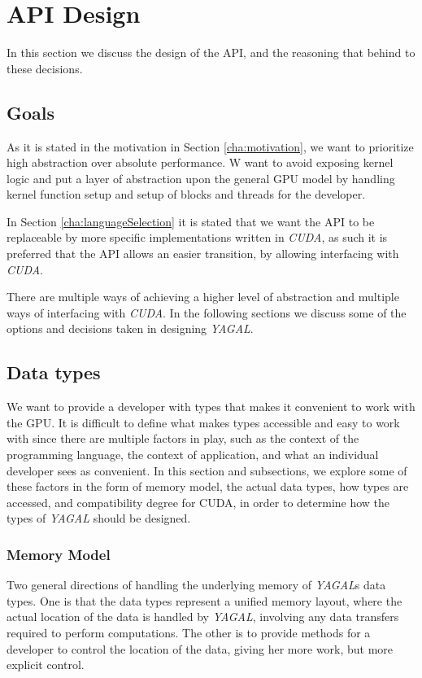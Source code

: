 \section{API Design}
In this section we discuss the design of the API, and the reasoning that behind to these decisions.

\subsection{Goals}
As it is stated in the motivation in Section \ref{cha:motivation}, we want to prioritize high abstraction over absolute performance. W want to avoid exposing kernel logic and put a layer of abstraction upon the general GPU model by handling kernel function setup and setup of blocks and threads for the developer.

In Section \ref{cha:languageSelection} it is stated that we want the API to be replaceable by more specific implementations written in \textit{CUDA}, as such it is preferred that the API allows an easier transition, by allowing interfacing with \textit{CUDA}.

There are multiple ways of achieving a higher level of abstraction and multiple ways of interfacing with \textit{CUDA}. In the following sections we discuss some of the options and decisions taken in designing \textit{YAGAL}.

\subsection{Data types}
We want to provide a developer with types that makes it convenient to work with the GPU. It is difficult to define what makes types accessible and easy to work with since there are multiple factors in play, such as the context of the programming language, the context of application, and what an individual developer sees as convenient. In this section and subsections, we explore some of these factors in the form of memory model, the actual data types, how types are accessed, and compatibility degree for CUDA, in order to determine how the types of \textit{YAGAL} should be designed.

\subsubsection{Memory Model} \label{memoryModelDesign}
Two general directions of handling the underlying memory of \textit{YAGAL}s data types. One is that the data types represent a unified memory layout, where the actual location of the data is handled by \textit{YAGAL}, involving any data transfers required to perform computations. The other is to provide methods for a developer to control the location of the data, giving her more work, but more explicit control. 

